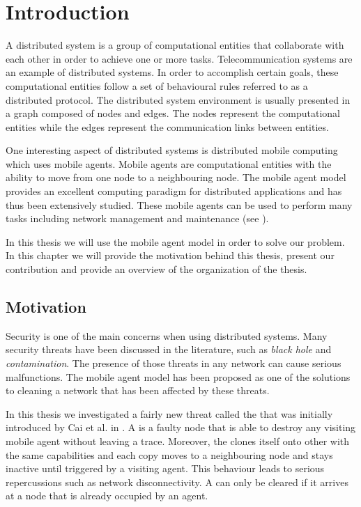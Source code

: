 \chapter {Introduction}
\label{INTRO}

  A distributed system is a group of computational entities that collaborate with each other in order to achieve one or more tasks. Telecommunication systems are an example of distributed systems.  In order to accomplish certain goals, these computational entities follow a set of behavioural rules referred to as a distributed protocol. The distributed system environment is usually presented in a graph composed of nodes and edges. The nodes represent the computational entities while the edges represent the communication links between entities.  

One interesting aspect of distributed systems is distributed mobile computing which uses mobile agents. Mobile agents are computational entities with the ability to move from one node to a neighbouring node. The mobile agent model provides an excellent computing paradigm for distributed applications and has thus been extensively studied. These mobile agents can be used to perform many tasks including network management and maintenance (see \cite{kimetal}).

In this thesis we will use the mobile agent model in order to solve our problem. In this chapter we will provide the motivation behind this thesis, present our contribution and provide an overview of the organization of the thesis. 



\section{Motivation} 

Security is one of the main concerns when using distributed systems.  Many security threats have been discussed in the literature, such as {\em black hole} and {\em contamination}. The presence of those threats in any network can cause serious malfunctions. The mobile agent model has been proposed as one of the solutions to cleaning a network that has been affected by these threats.  

In this thesis we investigated a fairly new threat called the \bv that was initially introduced by Cai et al. in \cite{caietal18}.  A \bv  is a faulty node that is able to destroy any visiting mobile agent without leaving a trace. Moreover, the \bv clones itself onto other \bvs with the same capabilities and each copy moves to a neighbouring node and stays inactive until triggered by a visiting agent. This behaviour leads to serious repercussions such as  network disconnectivity. A \bv can only be cleared if it arrives at a node that is already occupied by an agent.


